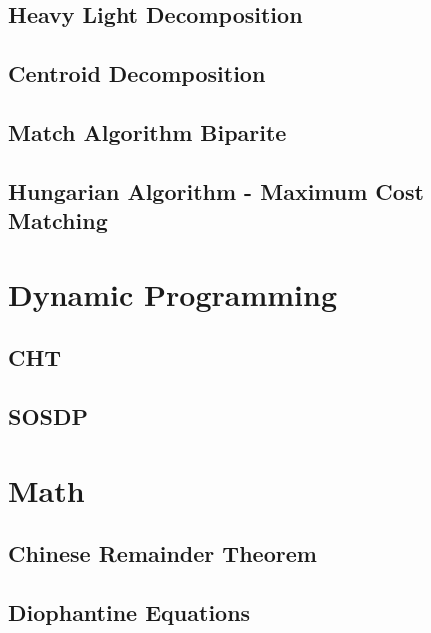 \subsection{Heavy Light Decomposition}
\raggedbottom
\hrulefill
\subsection{	Centroid Decomposition}
\raggedbottom
\hrulefill
\subsection{Match Algorithm Biparite}
\raggedbottom
\hrulefill
\subsection{Hungarian Algorithm - Maximum Cost Matching}
\raggedbottom
\hrulefill

\section{Dynamic Programming}
\subsection{CHT}
\raggedbottom
\hrulefill
\subsection{SOSDP}
\raggedbottom
\hrulefill

\section{Math}
\subsection{Chinese Remainder Theorem}
\raggedbottom
\hrulefill
\subsection{Diophantine Equations}
\raggedbottom
\hrulefill
